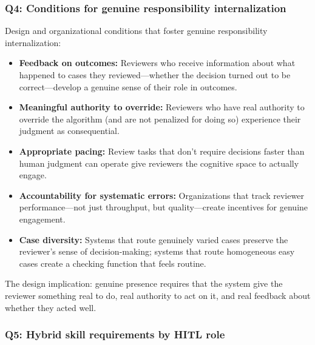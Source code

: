 \subsubsection*{Q4: Conditions for genuine responsibility internalization}

Design and organizational conditions that foster genuine responsibility internalization:

\begin{itemize}
    \item \textbf{Feedback on outcomes:} Reviewers who receive information about what happened to cases they reviewed---whether the decision turned out to be correct---develop a genuine sense of their role in outcomes.
    \item \textbf{Meaningful authority to override:} Reviewers who have real authority to override the algorithm (and are not penalized for doing so) experience their judgment as consequential.
    \item \textbf{Appropriate pacing:} Review tasks that don't require decisions faster than human judgment can operate give reviewers the cognitive space to actually engage.
    \item \textbf{Accountability for systematic errors:} Organizations that track reviewer performance---not just throughput, but quality---create incentives for genuine engagement.
    \item \textbf{Case diversity:} Systems that route genuinely varied cases preserve the reviewer's sense of decision-making; systems that route homogeneous easy cases create a checking function that feels routine.
\end{itemize}

The design implication: genuine presence requires that the system give the reviewer something real to do, real authority to act on it, and real feedback about whether they acted well.

\subsubsection*{Q5: Hybrid skill requirements by HITL role}

